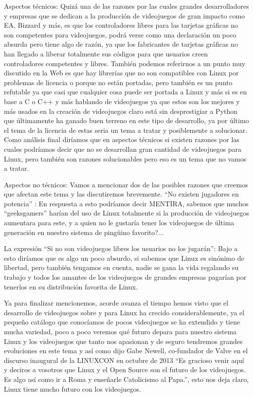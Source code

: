 Aspectos técnicos: Quizá una de las razones por las cuales
grandes desarrolladores y empresas que se dedican a la
producción de videojuegos de gran impacto como EA, Bizzard y
más, es que los controladores libres para las tarjetas gráficas
no son competentes para videojuegos, podrá verse como una
declaración un poco absurda pero tiene algo de razón, ya que los
fabricantes de tarjetas gráficas no han llegado a liberar
totalmente sus códigos para que usuarios creen controladores
competentes y libres. También podemos referirnos a un punto
muy discutido en la Web es que hay librerías que no son
compatibles con Linux por problemas de licencia o porque no
están portadas, pero también es un punto refutable ya que casi
que cualquier cosa puede ser portada a Linux y más si es en
base a C o C++ y más hablando de videojuegos ya que estos son
los mejores y más usados en la creación de videojuegos claro
está sin desprestigiar a Python que últimamente ha ganado buen
terreno en este tipo de desarrollo, ya por último el tema de la
licencia de estas seria un tema a tratar y posiblemente a
solucionar. Como análisis final diríamos que en aspectos técnicos
si existen razones por las cuales podríamos decir que no se
desarrollan gran cantidad de videojuegos para Linux, pero
también son razones solucionables pero eso es un tema que no
vamos a tratar.

Aspectos no técnicos: Vamos a mencionar dos de las posibles
razones que creemos que afectan este tema y las discutiremos
brevemente.
“No existen jugadores en potencia” : En respuesta a esto
podríamos decir MENTIRA, sabemos que muchos “geeksgamers”
harían del uso de Linux totalmente si la producción de
videojuegos aumentara para este, y a quien no le gustaría tener
los videojuegos de última generación en nuestro sistema de
pingüino favorito?...

La expresión “Si no son videojuegos libres los usuarios no los
jugarán”: Bajo a esto diríamos que es algo un poco absurdo, si
sabemos que Linux es sinónimo de libertad, pero también
tengamos en cuenta, nadie se gana la vida regalando su trabajo
y todos los amantes de los videojuegos de grandes empresas
pagarían por tenerlos en su distribución favorita de Linux.

Ya para finalizar mencionemos, acorde avanza el tiempo hemos
visto que el desarrollo de videojuegos sobre y para Linux ha
crecido considerablemente, ya el pequeño catálogo que
conocíamos de pocos videojuegos se ha extendido y tiene mucha
variedad, poco a poco veremos qué futuro depara para nuestro
sistema Linux y los videojuegos que tanto nos apasionan y de
seguro tendremos grandes evoluciones en este tema y así como
dijo Gabe Newell, co-fundador de Valve en el discurso inaugural
de la LINUXCON en octubre de 2013 “Es gracioso venir aquí y
deciros a vosotros que Linux y el Open Source son el futuro de
los videojuegos. Es algo así como ir a Roma y enseñarle
Catolicismo al Papa.”, esto nos deja claro, Linux tiene mucho
futuro con los videojuegos.

